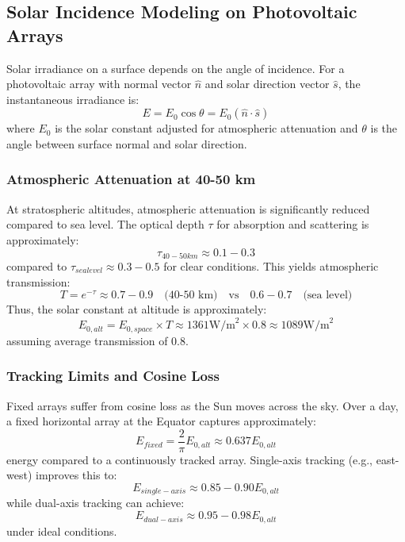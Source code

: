 {{{{\subsection{Solar Incidence Modeling on Photovoltaic Arrays}
Solar irradiance on a surface depends on the angle of incidence. For a photovoltaic array with normal vector $\hat{n}$ and solar direction vector $\hat{s}$, the instantaneous irradiance is:
\begin{equation}
E = E_0 \cos\theta = E_0 (\hat{n} \cdot \hat{s})
\end{equation}
where $E_0$ is the solar constant adjusted for atmospheric attenuation and $\theta$ is the angle between surface normal and solar direction.

\subsubsection{Atmospheric Attenuation at 40-50 km}
At stratospheric altitudes, atmospheric attenuation is significantly reduced compared to sea level. The optical depth $\tau$ for absorption and scattering is approximately:
\begin{equation}
\tau_{40-50km} \approx 0.1-0.3
\end{equation}
compared to $\tau_{sea level} \approx 0.3-0.5$ for clear conditions. This yields atmospheric transmission:
\begin{equation}
T = e^{-\tau} \approx 0.7-0.9 \quad \text{(40-50 km)} \quad \text{vs} \quad 0.6-0.7 \quad \text{(sea level)}
\end{equation}
Thus, the solar constant at altitude is approximately:
\begin{equation}
E_{0,alt} = E_{0,space} \times T \approx 1361  \text{W/m}^2 \times 0.8 \approx 1089  \text{W/m}^2
\end{equation}
assuming average transmission of 0.8.

\subsubsection{Tracking Limits and Cosine Loss}
Fixed arrays suffer from cosine loss as the Sun moves across the sky. Over a day, a fixed horizontal array at the Equator captures approximately:
\begin{equation}
E_{fixed} = \frac{2}{\pi} E_{0,alt} \approx 0.637 E_{0,alt}
\end{equation}
energy compared to a continuously tracked array. Single-axis tracking (e.g., east-west) improves this to:
\begin{equation}
E_{single-axis} \approx 0.85-0.90 E_{0,alt}
\end{equation}
while dual-axis tracking can achieve:
\begin{equation}
E_{dual-axis} \approx 0.95-0.98 E_{0,alt}
\end{equation}
under ideal conditions.

}}}}
